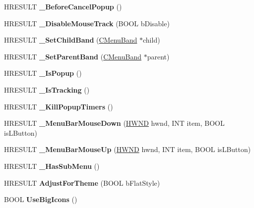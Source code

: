 \begin{DoxyCompactItemize}
\mbox{\label{class_c_menu_band_afcdb9ecafcbc2ae71f1a4a8f2957b477}} 
H\+R\+E\+S\+U\+LT {\bfseries \+\_\+\+Before\+Cancel\+Popup} ()
\item 
\mbox{\label{class_c_menu_band_a5d243b70fe0d69c22238459a6f171c7e}} 
H\+R\+E\+S\+U\+LT {\bfseries \+\_\+\+Disable\+Mouse\+Track} (B\+O\+OL b\+Disable)
\item 
\mbox{\label{class_c_menu_band_abbab8cf2a4891e3121b270acfe4432b1}} 
H\+R\+E\+S\+U\+LT {\bfseries \+\_\+\+Set\+Child\+Band} (\hyperlink{class_c_menu_band}{C\+Menu\+Band} $\ast$child)
\item 
\mbox{\label{class_c_menu_band_a73c1410027ce18832f4b118aea6e85a2}} 
H\+R\+E\+S\+U\+LT {\bfseries \+\_\+\+Set\+Parent\+Band} (\hyperlink{class_c_menu_band}{C\+Menu\+Band} $\ast$parent)
\item 
\mbox{\label{class_c_menu_band_a0e6f5a17b6697c4118a3fbc5cf1ea04d}} 
H\+R\+E\+S\+U\+LT {\bfseries \+\_\+\+Is\+Popup} ()
\item 
\mbox{\label{class_c_menu_band_ac44daed000ff3f3d2cc5ba1443474b92}} 
H\+R\+E\+S\+U\+LT {\bfseries \+\_\+\+Is\+Tracking} ()
\item 
\mbox{\label{class_c_menu_band_a633c98a3f079455b2a7f598b39ed5dc4}} 
H\+R\+E\+S\+U\+LT {\bfseries \+\_\+\+Kill\+Popup\+Timers} ()
\item 
\mbox{\label{class_c_menu_band_ace31257fa9d0895292fdbb1a2889a777}} 
H\+R\+E\+S\+U\+LT {\bfseries \+\_\+\+Menu\+Bar\+Mouse\+Down} (\hyperlink{interfacevoid}{H\+W\+ND} hwnd, I\+NT item, B\+O\+OL is\+L\+Button)
\item 
\mbox{\label{class_c_menu_band_a6a116b5eeb303f3d4b37d3cf760acfc0}} 
H\+R\+E\+S\+U\+LT {\bfseries \+\_\+\+Menu\+Bar\+Mouse\+Up} (\hyperlink{interfacevoid}{H\+W\+ND} hwnd, I\+NT item, B\+O\+OL is\+L\+Button)
\item 
\mbox{\label{class_c_menu_band_ad42405ef1dd1d083a145f6b038184944}} 
H\+R\+E\+S\+U\+LT {\bfseries \+\_\+\+Has\+Sub\+Menu} ()
\item 
\mbox{\label{class_c_menu_band_abfb9c3318d696b2e59e333e6f9425348}} 
H\+R\+E\+S\+U\+LT {\bfseries Adjust\+For\+Theme} (B\+O\+OL b\+Flat\+Style)
\item 
\mbox{\label{class_c_menu_band_a4e171b5db7e9e472f8abbf945a34577b}} 
B\+O\+OL {\bfseries Use\+Big\+Icons} ()
\end{DoxyCompactItemize}
